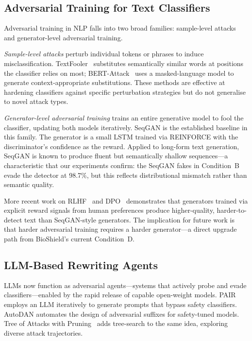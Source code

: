 \documentclass[12pt,a4paper]{article}
\begin{document}
\subsection{Adversarial Training for Text Classifiers}

Adversarial training in NLP falls into two broad families: sample-level
attacks and generator-level adversarial training.

\emph{Sample-level attacks} perturb individual tokens or phrases to
induce misclassification. TextFooler~\cite{jin2020textfooler} substitutes
semantically similar words at positions the classifier relies on most;
BERT-Attack~\cite{li2020bertattack} uses a masked-language model to
generate context-appropriate substitutions. These methods are effective
at hardening classifiers against specific perturbation strategies but do
not generalise to novel attack types.

\emph{Generator-level adversarial training} trains an entire generative
model to fool the classifier, updating both models iteratively. SeqGAN
\cite{yu2017seqgan} is the established baseline in this family. The
generator is a small LSTM trained via REINFORCE with the discriminator's
confidence as the reward. Applied to long-form text generation, SeqGAN
is known to produce fluent but semantically shallow sequences—a characteristic
that our experiments confirm: the SeqGAN fakes in Condition~B evade the
detector at 98.7\%, but this reflects distributional mismatch rather than
semantic quality.

More recent work on RLHF~\cite{ouyang2022rlhf} and DPO~\cite{rafailov2023dpo}
demonstrates that generators trained via explicit reward signals from human
preferences produce higher-quality, harder-to-detect text than SeqGAN-style
generators. The implication for future work is that harder adversarial
training requires a harder generator—a direct upgrade path from BioShield's
current Condition~D.

\subsection{LLM-Based Rewriting Agents}

LLMs now function as adversarial agents—systems that actively probe and
evade classifiers—enabled by the rapid release of capable open-weight models. PAIR~\cite{chao2024jailbreaking} employs an
LLM iteratively to generate prompts that bypass safety classifiers. AutoDAN
\cite{liu2023autodan} automates the design of adversarial suffixes for
safety-tuned models. Tree of Attacks with Pruning~\cite{mehrotra2024toa}
adds tree-search to the same idea, exploring diverse attack trajectories.
\end{document}
